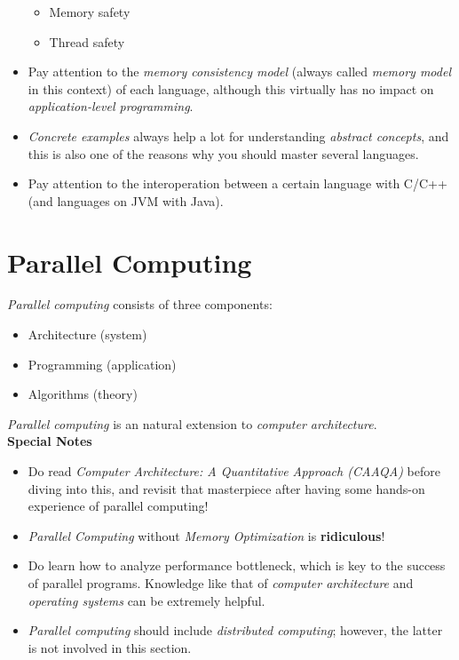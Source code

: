 \documentclass{article}
\begin{document}
\begin{itemize}
\begin{itemize}
                \item Memory safety
                \item Thread safety
            \end{itemize}
            \item Pay attention to the \emph{memory consistency model} (always called \emph{memory model} in this context) of each language, although this virtually has no impact on \emph{application-level programming}.
            \item \emph{Concrete examples} always help a lot for understanding \emph{abstract concepts}, and this is also one of the reasons why you should master several languages.
            \item Pay attention to the interoperation between a certain language with C/C++ (and languages on JVM with Java).
        \end{itemize}

\section{Parallel Computing}
\emph{Parallel computing} consists of three components:
\begin{itemize}
    \item Architecture (system)
    \item Programming (application)
    \item Algorithms (theory)
\end{itemize}
\emph{Parallel computing} is an natural extension to \emph{computer architecture}.\\
\textbf{Special Notes}
\begin{itemize}
    \item Do read \emph{Computer Architecture: A Quantitative Approach (CAAQA)} before diving into this, and revisit that masterpiece after having some hands-on experience of parallel computing!
    \item \emph{Parallel Computing} without \emph{Memory Optimization} is \textbf{ridiculous}!
    \item Do learn how to analyze performance bottleneck, which is key to the success of parallel programs.
    Knowledge like that of \emph{computer architecture} and \emph{operating systems} can be extremely helpful.
    \item \emph{Parallel computing} should include \emph{distributed computing}; however, the latter is not involved in this section.
\end{itemize}
\end{document}
